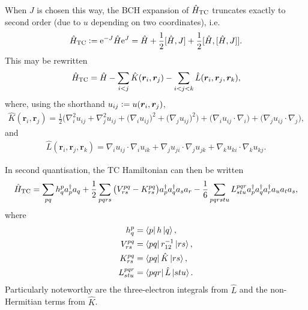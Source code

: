 When $J$ is chosen this way, the \gls{BCH} expansion of $\hat H_\mathrm{TC}$ truncates exactly to second order (due to $u$ depending on two coordinates), i.e.
\begin{equation}
    \hat H_\mathrm{TC} \mathrel{\mathop:}= \mathrm{e}^{-J}\hat H\mathrm{e}^J= \hat H + \frac 12[\hat H, J] + \frac 12[\hat H, [\hat H, J]].
\end{equation}
This may be rewritten
\begin{equation}
    \hat H_\mathrm{TC} = \hat H - \sum_{i<j}\hat K(\bm r_i, \bm r_j) - \sum_{i<j<k}\hat L(\bm r_i, \bm r_j, \bm r_k),
\end{equation}
where, using the shorthand $u_{ij} \mathrel{\mathop:}= u(\bm r_i, \bm r_j)$,
\begin{equation}
\begin{split}
    \hat{K}(\bm{r}_i, \bm{r}_j) = \frac{1}{2} \Bigg(
        \nabla_i^2 u_{ij} + \nabla_j^2 u_{ij} +
        \big(\nabla_i u_{ij}\big)^2
        + \big(\nabla_j u_{ij}\big)^2\Bigg)
        + \big(\nabla_i u_{ij} \cdot \nabla_i\big)
        + \big(\nabla_j u_{ij} \cdot \nabla_j\big)
        ,
\end{split}
\end{equation}
and
\begin{equation}
\begin{split}
\hat{L}(\bm{r}_i, \bm{r}_j, \bm{r}_k) =
\nabla_i u_{ij} \cdot \nabla_i u_{ik} +
\nabla_j u_{ji} \cdot \nabla_j u_{jk} +
\nabla_k u_{ki} \cdot \nabla_k u_{kj}.
\end{split}
\end{equation}

In second quantisation, the TC Hamiltonian can then be written
\begin{equation}
    \hat H_\mathrm{TC} = \sum_{pq} h_q^p a_p^\dagger a_q
    + \frac{1}{2} \sum_{pqrs} \big(V_{rs}^{pq} - K_{rs}^{pq}\big)
    a_p^\dagger a_q^\dagger a_s a_r
    - \frac{1}{6} \sum_{pqrstu} L_{stu}^{pqr}
    a_p^\dagger a_q^\dagger a_r^\dagger a_u a_t a_s,
\end{equation}
where
\begin{equation}
\begin{split}
    h_q^p &= \bra{p}h\ket{q}, \\
    V_{rs}^{pq} &= \bra{p q } r_{12}^{-1} \ket{ r s}, \\
    K_{rs}^{pq} &= \bra{p q } \hat{K} \ket{ r s}, \\
    L_{stu}^{pqr} &= \bra{p q r } \hat{L} \ket{s t u}.
\end{split}
\end{equation}
Particularly noteworthy are the three-electron integrals from $\hat L$ and the non-Hermitian terms from $\hat K$.

